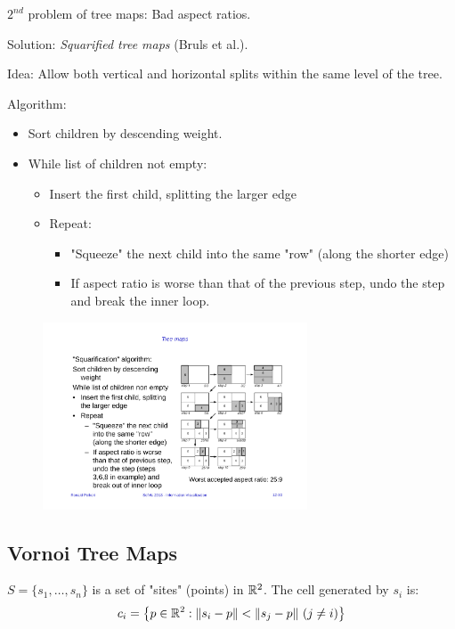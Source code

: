 $2^{nd}$ problem of tree maps: Bad aspect ratios. 

Solution: \emph{Squarified tree maps} (Bruls et al.).

Idea: Allow both vertical and horizontal splits within the same level of the tree.

Algorithm:
\begin{itemize}
\item Sort children by descending weight.
\item While list of children not empty:
\begin{itemize}
    \item Insert the first child, splitting the larger edge
    \item Repeat:
        \begin{itemize}
            \item "Squeeze" the next child into the same "row" (along the shorter edge)
            \item If aspect ratio is worse than that of the previous step, undo the step and break the inner loop.
        \end{itemize}
\end{itemize}
\end{itemize}

\begin{figure}[H]
\centering
\includegraphics[width=0.7\textwidth]{img/12_squarified_tree_map}
\end{figure}

\subsection{Vornoi Tree Maps}
$S=\{s_1,\ldots,s_n\}$ is a set of "sites" (points) in $\mathbb{R}^2$. The cell generated by $s_i$ is:
\begin{align*}
    c_i = \left\{
        p\in \R^2: \norm{s_i-p} < \norm{s_j-p}\ (j\neq i)
    \right\}
\end{align*}

